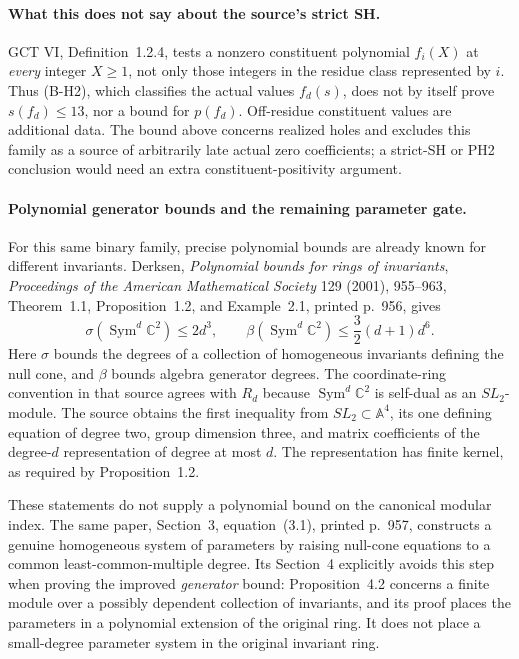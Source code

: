 \documentclass[11pt,a4paper]{article}
\begin{document}
\paragraph{What this does not say about the source's strict SH.}
GCT VI, Definition~1.2.4, tests a nonzero constituent polynomial
$f_i(X)$ at \emph{every} integer $X\ge1$, not only those integers
in the residue class represented by $i$. Thus (B-H2), which
classifies the actual values $f_d(s)$, does not by itself prove
$s(f_d)\le13$, nor a bound for $p(f_d)$. Off-residue constituent
values are additional data. The bound above concerns realized
holes and excludes this family as a source of arbitrarily late
actual zero coefficients; a strict-SH or PH2 conclusion would need
an extra constituent-positivity argument.

\paragraph{Polynomial generator bounds and the remaining parameter gate.}
For this same binary family, precise polynomial bounds are already
known for different invariants. Derksen,
\emph{Polynomial bounds for rings of invariants},
\emph{Proceedings of the American Mathematical Society} 129 (2001),
955--963, Theorem~1.1, Proposition~1.2, and Example~2.1,
printed p.~956, gives
\[
 \sigma(\operatorname{Sym}^d\mathbb C^2)\le2d^3,
 \qquad
 \beta(\operatorname{Sym}^d\mathbb C^2)
       \le\frac32(d+1)d^6.
 \tag{B-H3}
\]
Here $\sigma$ bounds the degrees of a collection of homogeneous
invariants defining the null cone, and $\beta$ bounds algebra
generator degrees. The coordinate-ring convention in that source
agrees with $R_d$ because $\operatorname{Sym}^d\mathbb C^2$ is
self-dual as an $SL_2$-module. The source obtains the first inequality from
$SL_2\subset\mathbb A^4$, its one defining equation of degree two,
group dimension three, and matrix coefficients of the degree-$d$
representation of degree at most $d$. The representation has
finite kernel, as required by Proposition~1.2.

These statements do not supply a polynomial bound on the canonical
modular index. The same paper, Section~3, equation~(3.1), printed
p.~957, constructs a genuine homogeneous system of parameters by
raising null-cone equations to a common least-common-multiple
degree. Its Section~4 explicitly avoids this step when proving
the improved \emph{generator} bound: Proposition~4.2 concerns a
finite module over a possibly dependent collection of invariants,
and its proof places the parameters in a polynomial extension of
the original ring. It does not place a small-degree parameter
system in the original invariant ring.
\end{document}

